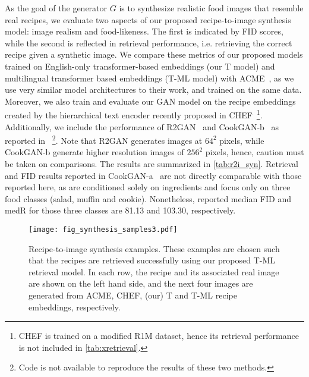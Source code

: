 \documentclass[sigconf,nonacm]{acmart}
\begin{document}
As the goal of the generator $G$ is to synthesize realistic food images that resemble real recipes, we evaluate two aspects of our proposed recipe-to-image synthesis model: image realism and food-likeness. The first is indicated by FID scores, while the second is reflected in retrieval performance, i.e. retrieving the correct recipe given a synthetic image. We compare these metrics of our proposed models trained on English-only transformer-based embeddings (our T model) and multilingual transformer based embeddings (T-ML model) with ACME~\cite{wang2019}, as we use very similar model architectures to their work, and trained on the same data. Moreover, we also train and evaluate our GAN model on the recipe embeddings created by the hierarchical text encoder recently proposed in CHEF~\cite{chef2021}\footnote{CHEF is trained on a modified R1M dataset, hence its retrieval performance is not included in \autoref{tab:xretrieval}.}. Additionally, we include the performance of R2GAN~\cite{Zhu2019} and CookGAN-b~\cite{zhu2020} as reported in ~\cite{zhu2020}\footnote{Code is not available to reproduce the results of these two methods.}. Note that R2GAN generates images at $64^2$ pixels, while CookGAN-b generate higher resolution images of $256^2$ pixels, hence, caution must be taken on comparisons. The results are summarized in \autoref{tab:r2i_syn}. Retrieval and FID results reported in CookGAN-a~\cite{Han2020} are not directly comparable with those reported here, as are conditioned solely on ingredients and focus only on three food classes (salad, muffin and cookie). Nonetheless, reported median FID and medR for those three classes are 81.13 and 103.30, respectively.

\begin{figure*}[!ht]
    \centering
    \texttt{[image: fig\_synthesis\_samples3.pdf]}
    \caption{Recipe-to-image synthesis examples. These examples 
    are chosen such that the recipes are 
retrieved successfully using our proposed T-ML 
    retrieval 
    model. In each row, the recipe and its associated real image are shown on the left hand side, and the next four images are generated from ACME, CHEF, (our) T and T-ML recipe embeddings, respectively. 
    }
    \label{fig:synthesis}
\end{figure*}
\end{document}
